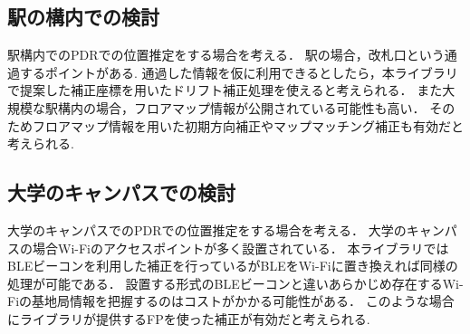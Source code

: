 \subsection{駅の構内での検討}
駅構内でのPDRでの位置推定をする場合を考える．
駅の場合，改札口という通過するポイントがある.
通過した情報を仮に利用できるとしたら，本ライブラリで提案した補正座標を用いたドリフト補正処理を使えると考えられる．
また大規模な駅構内の場合，フロアマップ情報が公開されている可能性も高い．
そのためフロアマップ情報を用いた初期方向補正やマップマッチング補正も有効だと考えられる.


\subsection{大学のキャンパスでの検討}
大学のキャンパスでのPDRでの位置推定をする場合を考える．
大学のキャンパスの場合Wi-Fiのアクセスポイントが多く設置されている．
本ライブラリではBLEビーコンを利用した補正を行っているがBLEをWi-Fiに置き換えれば同様の処理が可能である．
設置する形式のBLEビーコンと違いあらかじめ存在するWi-Fiの基地局情報を把握するのはコストがかかる可能性がある．
このような場合にライブラリが提供するFPを使った補正が有効だと考えられる.
